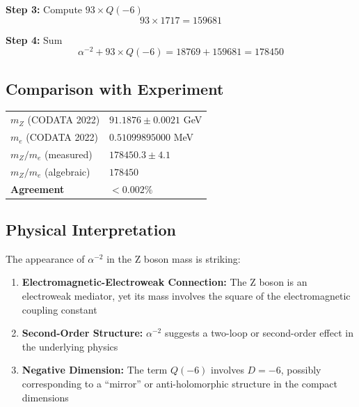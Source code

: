 \documentclass[11pt,a4paper]{article}
\begin{document}
\textbf{Step 3:} Compute $93 \times Q(-6)$
\begin{equation}
93 \times 1717 = 159681
\end{equation}

\textbf{Step 4:} Sum
\begin{equation}
\alpha^{-2} + 93 \times Q(-6) = 18769 + 159681 = 178450
\end{equation}

\subsection{Comparison with Experiment}

\begin{center}
\begin{tabular}{ll}
\hline
$m_Z$ (CODATA 2022) & $91.1876 \pm 0.0021$ GeV \\
$m_e$ (CODATA 2022) & $0.51099895000$ MeV \\
$m_Z/m_e$ (measured) & $178450.3 \pm 4.1$ \\
$m_Z/m_e$ (algebraic) & $178450$ \\
\textbf{Agreement} & $< 0.002\%$ \\
\hline
\end{tabular}
\end{center}

\subsection{Physical Interpretation}

The appearance of $\alpha^{-2}$ in the Z boson mass is striking:

\begin{enumerate}
    \item \textbf{Electromagnetic-Electroweak Connection:} The Z boson is an electroweak mediator, yet its mass involves the square of the electromagnetic coupling constant
    
    \item \textbf{Second-Order Structure:} $\alpha^{-2}$ suggests a two-loop or second-order effect in the underlying physics
    
    \item \textbf{Negative Dimension:} The term $Q(-6)$ involves $D = -6$, possibly corresponding to a ``mirror'' or anti-holomorphic structure in the compact dimensions
\end{enumerate}

\end{document}
